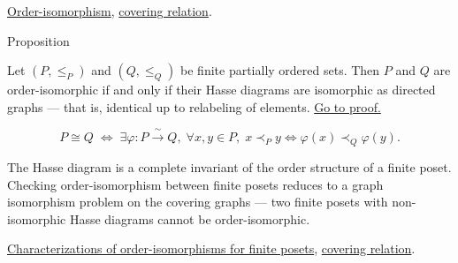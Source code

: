 \begin{dependencies}
\hyperref[def:order-isomorphism]{Order-isomorphism},
\hyperref[def:covering-relation]{covering relation}.
\end{dependencies}


\begin{propositionbox}{Proposition}
\begin{proposition}
\label{prop:hasse-diagram-characterization}
Let $(P, \leq_P)$ and $(Q, \leq_Q)$ be finite partially ordered sets.
Then $P$ and $Q$ are order-isomorphic if and only if their Hasse diagrams
are isomorphic as directed graphs --- that is, identical up to relabeling
of elements.
\hyperref[prf:hasse-diagram-characterization]{Go to proof.}
\end{proposition}
\end{propositionbox}

\begin{remark*}
\[
P \cong Q
\;\Longleftrightarrow\;
\exists \varphi : P \xrightarrow{\;\sim\;} Q,\;
\forall x, y \in P,\;
x \prec_P y \Leftrightarrow \varphi(x) \prec_Q \varphi(y).
\]
\end{remark*}

\begin{remark*}[Interpretation]
The Hasse diagram is a complete invariant of the order structure of a
finite poset.  Checking order-isomorphism between finite posets reduces
to a graph isomorphism problem on the covering graphs --- two finite posets
with non-isomorphic Hasse diagrams cannot be order-isomorphic.
\end{remark*}

\begin{dependencies}
\hyperref[lem:order-iso-finite-characterizations]{Characterizations of order-isomorphisms for finite posets},
\hyperref[def:covering-relation]{covering relation}.
\end{dependencies}

